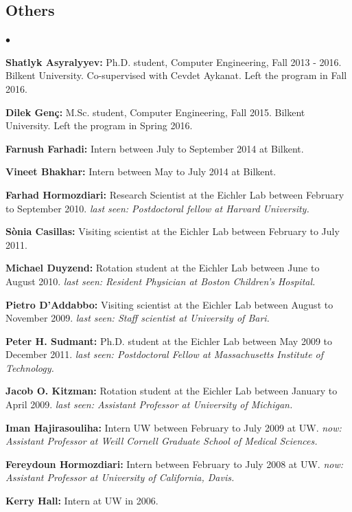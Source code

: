 \documentclass[margin,line]{res}
\newenvironment{list2}{
  \begin{list}{$\bullet$}{%
      \setlength{\itemsep}{0.1cm}
      \setlength{\parsep}{0in} \setlength{\parskip}{0in}
      \setlength{\topsep}{0in} \setlength{\partopsep}{0in} 
      \setlength{\leftmargin}{0.2in}}}{\end{list}}
\begin{document}
\begin{resume}
\subsection{\small \sc Others}
\begin{list2}
\item
  {\bf Shatlyk Asyralyyev:} Ph.D. student, Computer Engineering, Fall 2013 - 2016.
  Bilkent University. Co-supervised with Cevdet Aykanat. Left the program in Fall 2016.
\item
{\bf Dilek Genç:} M.Sc. student, Computer Engineering, Fall 2015.
  Bilkent University. Left the program in Spring 2016. 
\item
  {\bf Farnush Farhadi:} Intern between July to September 2014 at Bilkent.
\item
  {\bf Vineet Bhakhar:} Intern between May to July 2014 at Bilkent. 
\item
  {\bf Farhad Hormozdiari:} Research Scientist at the Eichler Lab between February to September 2010.
  {\it last seen: Postdoctoral fellow  at Harvard University.}
\item
  {\bf S\`{o}nia Casillas:} Visiting scientist at the Eichler Lab between February to July 2011.
\item
  {\bf Michael Duyzend:} Rotation student at the Eichler Lab between June to August 2010.
  {\it last seen:  Resident Physician at Boston Children's Hospital.}
\item
  {\bf Pietro D'Addabbo:} Visiting scientist at the Eichler Lab between August to November 2009.
  {\it last seen: Staff scientist at University of Bari.}
\item
  {\bf Peter H. Sudmant:} Ph.D. student at the Eichler Lab between May 2009 to December 2011.
  {\it last seen: Postdoctoral Fellow at Massachusetts Institute of Technology.}
\item
  {\bf Jacob O. Kitzman:} Rotation student at the Eichler Lab between January to April 2009.
  {\it last seen: Assistant Professor at University of Michigan.}
\item
  {\bf Iman Hajirasouliha:}  Intern UW between February to July 2009 at UW.
  {\it now: Assistant Professor at Weill Cornell Graduate School of Medical Sciences.}
\item
  {\bf Fereydoun Hormozdiari:} Intern between February to July 2008 at UW. 
  {\it now: Assistant Professor at University of California, Davis.}
\item
  {\bf Kerry Hall:} Intern at UW in 2006.  
\end{list2}


\end{resume}
\end{document}
